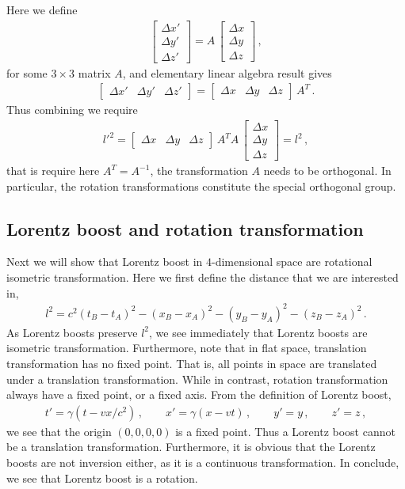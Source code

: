 \documentclass[11pt, onesided]{book}
\theoremstyle{break}
\theoremstyle{break}
\newcommand{\bmat}[1]{\begin{bmatrix} #1 \end{bmatrix}}
\begin{document}
Here we define
\begin{align*}
\bmat{\Delta x' \\ \Delta y' \\ \Delta z'} = A\,\bmat{\Delta x \\ \Delta y \\ \Delta z}\,,
\end{align*}
for some $3\times 3$ matrix $A$, and elementary linear algebra result gives
\begin{align*}
\bmat{\Delta x' & \Delta y' & \Delta z'} = \bmat{\Delta x & \Delta y & \Delta z} \,  A^T\,.
\end{align*}
Thus combining we require
\begin{align*}
l'^2 = \bmat{\Delta x & \Delta y & \Delta z}\, A^TA \, \bmat{\Delta x \\ \Delta y \\ \Delta z} = l^2\,,
\end{align*}
that is require here $A^T = A^{-1}$, the transformation $A$ needs to be orthogonal. In particular, the rotation transformations constitute the special orthogonal group.\\

\subsection*{Lorentz boost and rotation transformation}
Next we will show that Lorentz boost in $4$-dimensional space are rotational isometric transformation. Here we first define the distance that we are interested in,
\begin{align*}
l^2 = c^2 ( t_B - t_A)^2 - (x_B - x_A)^2 - (y_B - y_A)^2 - (z_B - z_A)^2 \,.
\end{align*}
As Lorentz boosts preserve $l^2$, we see immediately that Lorentz boosts are isometric transformation. Furthermore, note that in flat space, translation transformation has no fixed point. That is, all points in space are translated under a translation transformation. While in contrast, rotation transformation always have a fixed point, or a fixed axis. From the definition of Lorentz boost,
\begin{align*}
t' = \gamma(t - vx/c^2) \,,\qquad x' = \gamma(x- vt) \,,\qquad
y ' = y \,,\qquad z' = z\,,
\end{align*}
we see that the origin $(0,0,0,0)$ is a fixed point. Thus a Lorentz boost cannot be a translation transformation. Furthermore, it is obvious that the Lorentz boosts are not inversion either, as it is a continuous transformation. In conclude, we see that Lorentz boost is a rotation.\\
\end{document}
